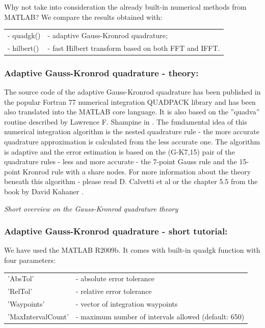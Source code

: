 \documentclass[12pt,twoside,a4paper]{article}
\numberwithin{equation}{subsection}
\numberwithin{figure}{subsection}
\begin{document}
Why not take into consideration the already built-in numerical methods from MATLAB? We compare the results obtained with: 


\begin{tabular}{l l}
  - quadgk() &- adaptive Gauss-Kronrod quadrature; \\
  - hilbert() &- fast Hilbert transform based on both FFT and IFFT. \\
\end{tabular}


\subsubsection*{Adaptive Gauss-Kronrod quadrature - theory:}

The source code of the adaptive Gauss-Kronrod quadrature has been published in the popular Fortran 77 numerical integration
QUADPACK library and has been also translated into the MATLAB core language. It is also based on the ''quadva'' routine described by
Lawrence F. Shampine in \cite{shampine_vectorized}. The fundamental idea of this numerical integration algorithm is the nested
quadrature rule - the more accurate quadrature approximation is calculated from the less accurate one. The algorithm is adaptive
and the error estimation is based on the (G-K7,15) pair of the quadrature rules - less and more accurate - the 7-point Gauss rule
and the 15-point Kronrod rule with a share nodes. For more information about the theory beneath this algorithm - please read D.
Calvetti et al \cite{calvetti_computation} or the chapter 5.5 from the book by David Kahaner \cite{kahaner_numerical}.

\textit{Short overview on the Gauss-Kronrod quadrature theory}

\subsubsection*{Adaptive Gauss-Kronrod quadrature - short tutorial:}

We have used the MATLAB \textregistered R2009b. It comes with built-in quadgk function with four parameters:


\begin{tabular}{l l}
  'AbsTol'           & - absolute error tolerance \\
  'RelTol'           & - relative error tolerance \\
  'Waypoints'        & - vector of integration waypoints \\
  'MaxIntervalCount' & - maximum number of intervals allowed (default: 650) \\
\end{tabular}
\end{document}
